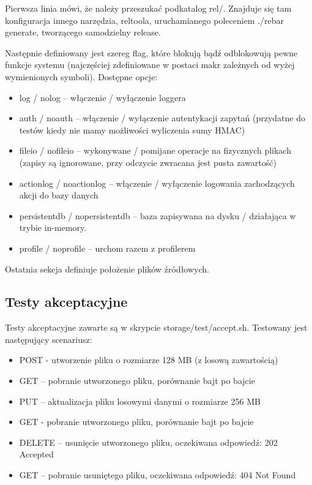 Pierwsza linia mówi, że należy przeszukać podkatalog rel/. Znajduje się tam konfiguracja innego narzędzia, reltoola, uruchamianego poleceniem ./rebar generate, tworzącego samodzielny release.

Następnie definiowany jest szereg flag, które blokują bądź odblokowują pewne funkcje systemu (najczęściej zdefiniowane w postaci makr zależnych od wyżej wymienionych symboli). Dostępne opcje:
\begin{itemize}
	\item log / nolog – włączenie / wyłączenie loggera
	\item auth / noauth – włączenie / wyłączenie autentykacji zapytań (przydatne do testów kiedy nie mamy możliwości wyliczenia sumy HMAC)
	\item fileio / nofileio – wykonywane / pomijane operacje na fizycznych plikach (zapisy są ignorowane, przy odczycie zwracana jest pusta zawartość)
	\item actionlog / noactionlog – włączenie / wyłączenie logowania zachodzących akcji do bazy danych
	\item persistentdb / nopersistentdb – baza zapisywana na dysku / działająca w trybie in-memory.
	\item profile / noprofile – urchom razem z profilerem
\end{itemize}

Ostatnia sekcja definiuje położenie plików źródłowych.




\subsection{Testy akceptacyjne}
Testy akceptacyjne zawarte są w skrypcie storage/test/accept.sh. Testowany jest następujący scenariusz:
\begin{itemize}
	\item POST - utworzenie pliku o rozmiarze 128 MB (z losową zawartością)
	\item GET – pobranie utworzonego pliku, porównanie bajt po bajcie
	\item PUT – aktualizacja pliku losowymi danymi o rozmiarze 256 MB
	\item GET - pobranie utworzonego pliku, porównanie bajt po bajcie
	\item DELETE – usunięcie utworzonego pliku, oczekiwana odpowiedź: 202 Accepted
	\item GET – pobranie usuniętego pliku, oczekiwana odpowiedź: 404 Not Found
\end{itemize}

